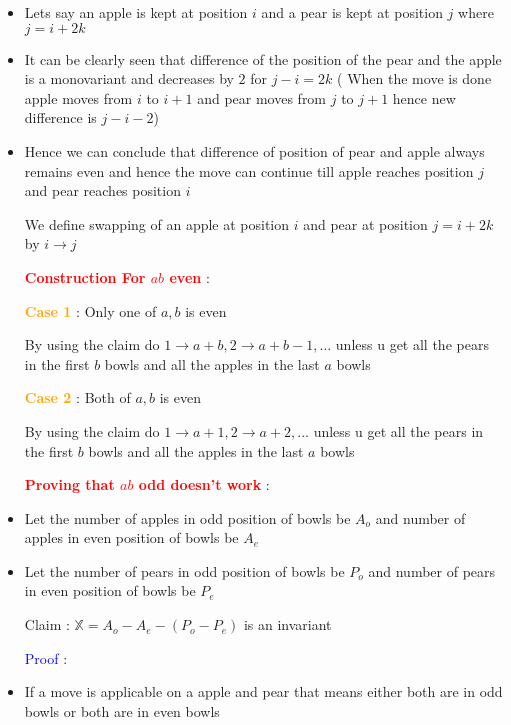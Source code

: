 \begin{itemize}

\item Lets say an apple is kept at position $i$ and a pear is kept at position $j$ where $j=i+2k$ 

\item It can be clearly seen that difference of the position of the pear and the apple is a monovariant and decreases by $2$ for $j-i=2k$ ( When the move is done apple  moves from $i$ to $i+1$ and pear moves from $j$ to $j+1$ hence new difference is $j-i -2$) 

\item Hence we can conclude that difference of position of pear and apple always remains even and hence the move can continue till apple reaches position $j$ and pear reaches position $i$

We define swapping of an apple at position $i$ and pear at position $j=i+2k$ by $i \to j$


\textcolor{red}{\textbf{Construction For $ab$ even }} :

\textcolor{orange}{\textbf{Case 1  }} : Only one of $a,b$ is even 

By using the claim do $1 \to a+b , 2 \to a+b-1 , \dots $ unless u get all the pears in the first $b$ bowls and all the apples in the last $a$ bowls  




\textcolor{orange}{\textbf{Case 2  }} : Both  of $a,b$ is even 

By using the claim do $1 \to a+1 , 2 \to a+2 ,  \dots $  unless u get all the pears in the first $b$ bowls and all the apples in the last $a$ bowls  

 \textcolor{red}{\textbf{Proving that  $ab$ odd doesn't work }} :

\item Let the number of apples in odd position of bowls  be $A_o$ and number of apples in even position of bowls  be $A_e$ 

\item Let the number of pears in odd position of bowls  be $P_o$ and number of pears in even position of bowls be $P_e$ 



 Claim : $ \mathbb{X} = A_o - A_e - ( P_o - P_e)$ is an invariant 


\textcolor{blue}{Proof }:

\item If a move is applicable on a apple and pear that means either both are in odd bowls or both are in even bowls 


\end{itemize}
